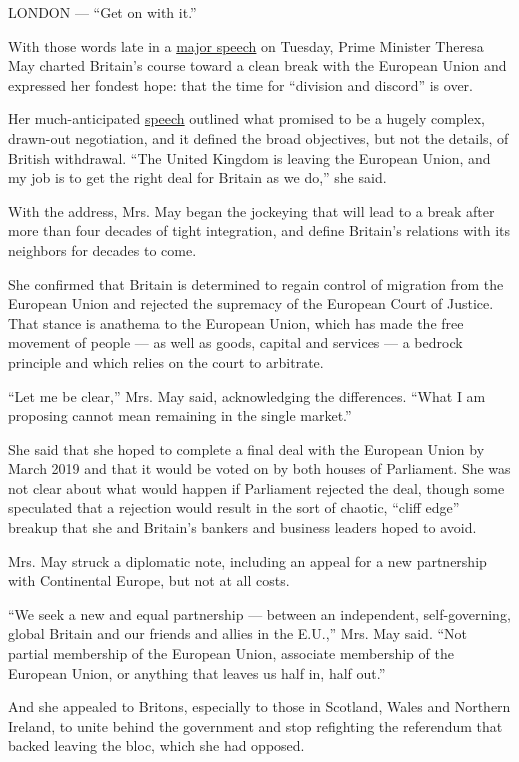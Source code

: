 LONDON --- ``Get on with it.''

With those words late in a
\href{http://www.nytimes.com/2017/01/17/world/europe/brexit-speech-quotes.html}{major
speech} on Tuesday, Prime Minister Theresa May charted Britain's course
toward a clean break with the European Union and expressed her fondest
hope: that the time for ``division and discord'' is over.

Her much-anticipated
\href{http://www.telegraph.co.uk/news/2017/01/17/theresa-mays-brexit-speech-full/}{speech}
outlined what promised to be a hugely complex, drawn-out negotiation,
and it defined the broad objectives, but not the details, of British
withdrawal. ``The United Kingdom is leaving the European Union, and my
job is to get the right deal for Britain as we do,'' she said.

With the address, Mrs. May began the jockeying that will lead to a break
after more than four decades of tight integration, and define Britain's
relations with its neighbors for decades to come.

She confirmed that Britain is determined to regain control of migration
from the European Union and rejected the supremacy of the European Court
of Justice. That stance is anathema to the European Union, which has
made the free movement of people --- as well as goods, capital and
services --- a bedrock principle and which relies on the court to
arbitrate.

``Let me be clear,'' Mrs. May said, acknowledging the differences.
``What I am proposing cannot mean remaining in the single market.''

She said that she hoped to complete a final deal with the European Union
by March 2019 and that it would be voted on by both houses of
Parliament. She was not clear about what would happen if Parliament
rejected the deal, though some speculated that a rejection would result
in the sort of chaotic, ``cliff edge'' breakup that she and Britain's
bankers and business leaders hoped to avoid.

Mrs. May struck a diplomatic note, including an appeal for a new
partnership with Continental Europe, but not at all costs.

``We seek a new and equal partnership --- between an independent,
self-governing, global Britain and our friends and allies in the E.U.,''
Mrs. May said. ``Not partial membership of the European Union, associate
membership of the European Union, or anything that leaves us half in,
half out.''

And she appealed to Britons, especially to those in Scotland, Wales and
Northern Ireland, to unite behind the government and stop refighting the
referendum that backed leaving the bloc, which she had opposed.


